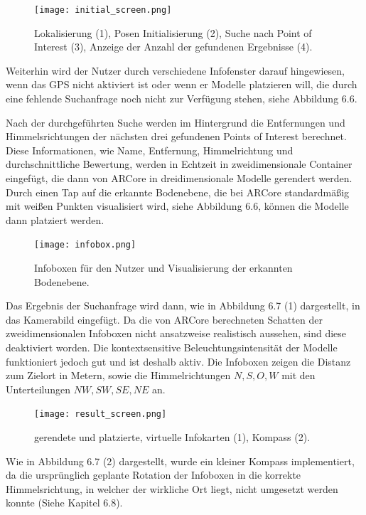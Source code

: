 \begin{figure}[H]
	\centering
	\texttt{[image: initial\_screen.png]}
	\caption{Lokalisierung (1), Posen Initialisierung (2),  Suche nach Point of Interest (3), Anzeige der Anzahl der gefundenen Ergebnisse (4).}
\end{figure} 

Weiterhin wird der Nutzer durch verschiedene Infofenster darauf hingewiesen, wenn das GPS nicht aktiviert ist oder wenn er Modelle platzieren will, die durch eine fehlende Suchanfrage noch nicht zur Verfügung stehen, siehe Abbildung 6.6. 

Nach der durchgeführten Suche werden im Hintergrund die Entfernungen und Himmelsrichtungen der nächsten drei gefundenen Points of Interest berechnet. Diese Informationen, wie Name, Entfernung, Himmelrichtung und durchschnittliche Bewertung, werden in Echtzeit in zweidimensionale Container eingefügt, die dann von ARCore in dreidimensionale Modelle gerendert werden. \\ Durch einen Tap auf die erkannte Bodenebene, die bei ARCore standardmäßig mit weißen Punkten visualisiert wird, siehe Abbildung 6.6, können die Modelle dann platziert werden.

\begin{figure}[H]
	\centering
	\texttt{[image: infobox.png]}
	\caption{Infoboxen für den Nutzer und Visualisierung der erkannten Bodenebene.}
\end{figure} 

Das Ergebnis der Suchanfrage wird dann, wie in Abbildung 6.7 (1) dargestellt, in das Kamerabild eingefügt. Da die von ARCore berechneten Schatten der zweidimensionalen Infoboxen nicht ansatzweise realistisch aussehen, sind diese deaktiviert worden. Die kontextsensitive Beleuchtungsintensität der Modelle funktioniert jedoch gut und ist deshalb aktiv. Die Infoboxen zeigen die Distanz zum Zielort in Metern, sowie die Himmelrichtungen $N, S, O, W$ mit den Unterteilungen $NW, SW, SE, NE$ an. 

\begin{figure}[H]
	\centering
	\hspace*{-0.5in}
	\texttt{[image: result\_screen.png]}
	\caption{gerendete und platzierte, virtuelle Infokarten (1), Kompass (2).}
\end{figure} 

Wie in Abbildung 6.7 (2) dargestellt, wurde ein kleiner Kompass implementiert, da die ursprünglich geplante Rotation der Infoboxen in die korrekte Himmelsrichtung, in welcher der wirkliche Ort liegt, nicht umgesetzt werden konnte (Siehe Kapitel 6.8). 


